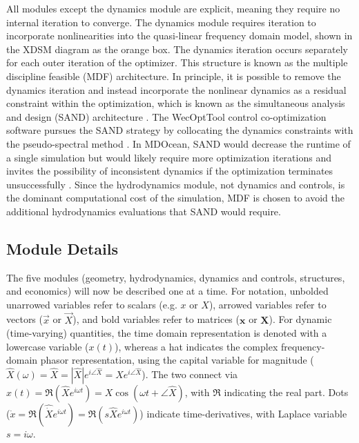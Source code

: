 All modules except the dynamics module are explicit, meaning they require no internal iteration to converge.
The dynamics module requires iteration to incorporate nonlinearities into the quasi-linear frequency domain model, shown in the XDSM diagram as the orange box.
The dynamics iteration occurs separately for each outer iteration of the optimizer.
This structure is known as the multiple discipline feasible (MDF) architecture.
In principle, it is possible to remove the dynamics iteration and instead incorporate the nonlinear dynamics as a residual constraint within the optimization, which is known as the simultaneous analysis and design (SAND) architecture \cite{martins_multidisciplinary_2013}.
The WecOptTool control co-optimization software pursues the SAND strategy by collocating the dynamics constraints with the pseudo-spectral method \cite{coe_initial_2020}.
In MDOcean, SAND would decrease the runtime of a single simulation but would likely require more optimization iterations and invites the possibility of inconsistent dynamics if the optimization terminates unsuccessfully \cite{martins_multidisciplinary_2013}.
Since the hydrodynamics module, not dynamics and controls, is the dominant computational cost of the simulation, MDF is chosen to avoid the additional hydrodynamics evaluations that SAND would require.

\subsection{Module Details}
\label{sec:modules}

The five modules (geometry, hydrodynamics, dynamics and controls, structures, and economics) will now be described one at a time.
For notation, unbolded unarrowed variables refer to scalars (e.g. $x$ or $X$), arrowed variables refer to vectors ($\vec{x}$ or $\vec{X}$), and bold variables refer to matrices ($\mathbf{x}$ or $\mathbf{X}$).
For dynamic (time-varying) quantities, the time domain representation is denoted with a lowercase variable ($x(t)$), whereas a hat indicates the complex frequency-domain phasor representation, using the capital variable for magnitude ($\hat{X}(\omega)=\hat{X}=|\hat{X}|e^{i\angle \hat{X}}=Xe^{i\angle \hat{X}}$).
The two connect via $x(t)=\Re(\hat{X}e^{i\omega t})=X\cos(\omega t+\angle\hat{X})$, with $\Re$ indicating the real part.
Dots ($\dot{x}=\Re(\hat{\dot{X}}e^{i\omega t})=\Re(s\hat{X}e^{i\omega t})$) indicate time-derivatives, with Laplace variable $s=i\omega$.

